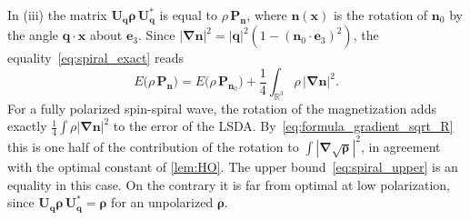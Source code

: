 \documentclass[final,reqno]{amsart}
\theoremstyle{remark}
\newcommand{\RR}{\mathbb{R}}
\newcommand{\grad}{\bm{\nabla}}
\begin{document}
In (iii) the matrix $\mathbf{U}_{\mathbf{q}}\bm{\rho}\,\mathbf{U}_{\mathbf{q}}^*$ is equal to $\rho\,\mathbf{P}_{\mathbf{n}}$, where $\mathbf{n}(\mathbf{x})$ is the rotation of $\mathbf{n}_0$ by the angle $\mathbf{q}\cdot\mathbf{x}$ about $\mathbf{e}_3$. Since $|\grad\mathbf{n}|^2=|\mathbf{q}|^2(1-(\mathbf{n}_0\cdot\mathbf{e}_3)^2)$, the equality~\cref{eq:spiral_exact} reads
$$
E\big(\rho\,\mathbf{P}_{\mathbf{n}}\big)=E\big(\rho\,\mathbf{P}_{\mathbf{n}_0}\big)+\frac14\int_{\RR^3}\rho\,|\grad\mathbf{n}|^2.
$$
For a fully polarized spin-spiral wave, the rotation of the magnetization adds exactly $\frac14\int\rho|\grad\mathbf{n}|^2$ to the error of the LSDA. By~\cref{eq:formula_gradient_sqrt_R} this is one half of the contribution of the rotation to $\int|\grad\sqrt{\bm{\rho}}|^2$, in agreement with the optimal constant of \cref{lem:HO}. The upper bound~\cref{eq:spiral_upper} is an equality in this case. On the contrary it is far from optimal at low polarization, since $\mathbf{U}_{\mathbf{q}}\bm{\rho}\,\mathbf{U}_{\mathbf{q}}^*=\bm{\rho}$ for an unpolarized $\bm{\rho}$.
\end{document}
